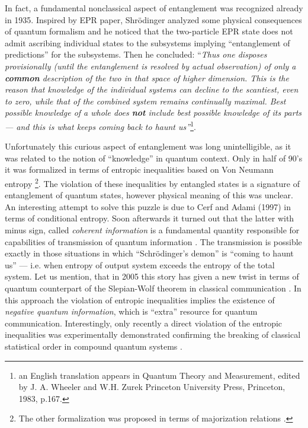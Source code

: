 \documentclass[rmp,12pt,preprint]{revtex4-2}
\begin{document}
In fact, a fundamental nonclassical aspect of entanglement was
recognized already in 1935. Inspired by EPR paper, Shr{\"o}dinger
analyzed some physical consequences of quantum formalism and he
noticed that the two-particle EPR state does not admit ascribing
individual states to the subsystems implying ``entanglement of
predictions'' for the subsystems. Then he concluded: {``\it Thus one
  disposes provisionally (until the entanglement is resolved by actual
  observation) of only a {\bf common} description of the two in that space
  of higher dimension. This is the reason that knowledge of the
  individual systems can decline to the scantiest, even to zero, while
  that of the combined system remains continually maximal. Best
  possible knowledge of a whole does {\bf not} include best possible
  knowledge of its parts --- and this is what keeps coming back to
  haunt us''}\cite{Schrodinger}\footnote{an English
translation appears in Quantum Theory and Measurement,
edited by J. A. Wheeler and W.H. Zurek Princeton University
Press, Princeton, 1983, p.167.}.

Unfortunately this curious aspect of entanglement was long
unintelligible, as it was related to the notion of ``knowledge'' in
quantum context. Only in half of 90's it was formalized in terms of
entropic inequalities based on Von Neumann entropy \cite
{RPH1994,alpha,cerfadami}\footnote {The other formalization was
  proposed in terms of majorization relations \cite
  {NielsenKempe}.}. The violation of these inequalities by entangled
states is a signature of entanglement of quantum states, however
physical meaning of this was unclear. An interesting attempt to solve
this puzzle is due to Cerf and Adami (1997)
in terms of conditional entropy. Soon afterwards it turned out that
the latter with minus sign, called {\it coherent information} is a
fundamental quantity responsible for capabilities of transmission of
quantum information \cite{SchumacherN-1996-pra,Lloyd-cap}. The
transmission is possible exactly in those situations in which
``Schr{\"o}dinger's demon'' is ``coming to haunt us'' --- i.e. when
entropy of output system exceeds the entropy of the total system.  Let
us mention, that in 2005 this story has given a new twist in terms of
quantum counterpart of the Slepian-Wolf theorem in classical
communication \cite {SW-nature,sw-long}. In this approach the
violation of entropic inequalities implies the existence of {\it
  negative quantum information}, which is ``extra'' resource for
quantum communication. Interestingly, only recently a direct violation
of the entropic inequalities was experimentally demonstrated
confirming the breaking of classical statistical order in compound
quantum systems \cite{NonlinExp}.
\end{document}
